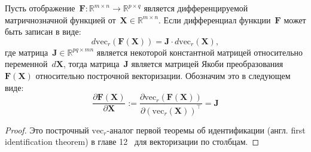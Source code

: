 \begin{lemma} \label{lemma:identification_theorem_vec_r}
    Пусть отображение~$\mathbf{F}: \mathbb{R}^{m\times n} \rightarrow \mathbb{R}^{p \times q}$ является дифференцируемой матричнозначной функцией от~$\mathbf{X} \in \mathbb{R}^{m \times n}$.
    Если дифференциал функции~$\mathbf{F}$ может быть записан в виде:
    \begin{equation}
        d \mathrm{vec}_r(\mathbf{F}(\mathbf{X})) = \mathbf{J} \cdot d \mathrm{vec}_r(\mathbf{X}),
    \end{equation}
    где матрица~$\mathbf{J} \in \mathbb{R}^{pq \times mn}$ является некоторой константной матрицей относительно переменной~$d\mathbf{X}$, тогда матрица~$\mathbf{J}$ является матрицей Якоби преобразования $\mathbf{F}(\mathbf{X})$ относительно построчной векторизации. Обозначим это в следующем виде:
    \begin{equation}
        \frac{\partial \mathbf{F}(\mathbf{X})}{\partial \mathbf{X}} := \frac{\partial \mathrm{vec}_r(\mathbf{F}(\mathbf{X}))}{\partial (\mathrm{vec}_r(\mathbf{X}))^\top} = \mathbf{J}
    \end{equation}
\end{lemma}
\begin{proof}
    Это построчный $\mathrm{vec}_r$-аналог первой теоремы об идентификации (англ. first identification theorem) в главе 12~\cite{magnus1988matrix} для векторизации по столбцам.
\end{proof}

